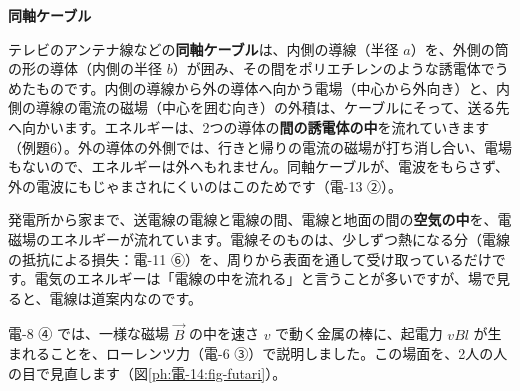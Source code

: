 \noindent\textbf{同軸ケーブル}\par\nobreak
テレビのアンテナ線などの\textbf{同軸ケーブル}は、内側の導線（半径 $a$）を、外側の筒の形の導体（内側の半径 $b$）が囲み、その間をポリエチレンのような誘電体でうめたものです。内側の導線から外の導体へ向かう電場（中心から外向き）と、内側の導線の電流の磁場（中心を囲む向き）の外積は、ケーブルにそって、送る先へ向かいます。エネルギーは、2つの導体の\textbf{間の誘電体の中}を流れていきます（例題6）。外の導体の外側では、行きと帰りの電流の磁場が打ち消し合い、電場もないので、エネルギーは外へもれません。同軸ケーブルが、電波をもらさず、外の電波にもじゃまされにくいのはこのためです（電-13 ②）。

\begin{phmijika}
発電所から家まで、送電線の電線と電線の間、電線と地面の間の\textbf{空気の中}を、電磁場のエネルギーが流れています。電線そのものは、少しずつ熱になる分（電線の抵抗による損失：電-11 ⑥）を、周りから表面を通して受け取っているだけです。電気のエネルギーは「電線の中を流れる」と言うことが多いですが、場で見ると、電線は道案内なのです。
\end{phmijika}


\leavevmode\label{ph:電-14:sec9}電-8 ④ では、一様な磁場 $\vec B$ の中を速さ $v$ で動く金属の棒に、起電力 $vBl$ が生まれることを、ローレンツ力（電-6 ③）で説明しました。この場面を、2人の人の目で見直します（図\ref{ph:電-14:fig-futari}）。

